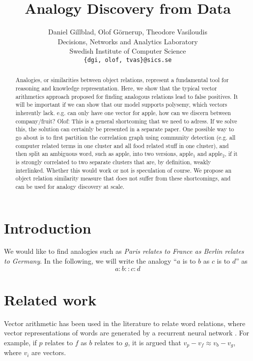 \documentclass{article} %
\title{Analogy Discovery from Data}
\author{
Daniel Gillblad, Olof G\"{o}rnerup, Theodore Vasiloudis \\
Decisions, Networks and Analytics Laboratory\\
Swedish Institute of Computer Science\\
\texttt{\{dgi, olof, tvas\}@sics.se}
}
\newcommand{\comment}[1]{{\small \color{red} {#1}} \normalcolor}
\begin{document}
\maketitle

\begin{abstract}
Analogies, or similarities between object relations, represent a fundamental tool for reasoning and knowledge 
representation. Here, we show that the typical vector arithmetics approach proposed for finding analogous relations lead to 
false positives. \comment{It will be important if we can show that our model supports polysemy, which vectors inherently lack. 
e.g. can only have one vector for apple, how can we discern between company/fruit? Olof: This is a general shortcoming that we
need to adress. If we solve this, the solution can certainly be presented in a separate paper. One possible way to go about is to first 
partition the correlation graph using community detection (e.g. all computer related terms in one cluster and all food related stuff in one
cluster), and then split an ambiguous word, such as apple, into two versions, apple$_1$ and apple$_2$, if it is strongly correlated to
two separate clusters that are, by definition, weakly interlinked. Whether this would work or not is speculation of course.}
We propose an object relation similarity measure that does not suffer from these shortcomings, and can be 
used for analogy discovery at scale.
\end{abstract}

\section{Introduction}

We would like to find analogies such as \emph{Paris relates to France as Berlin relates to Germany}. In the following, we 
will write the analogy ``$a$ is to $b$ as $c$ is to $d$'' as
\begin{equation}
a : b :: c : d
\end{equation}

\section{Related work}
Vector arithmetic has been used in the literature to relate word relations, where vector representations
of words are generated by a recurrent neural network \cite{Mikolov2013}. For example, if
$p$ relates to $f$ as $b$ relates to $g$, it is argued that $v_{p} - v_{f} \approx v_{b} - v_{g}$, where $v_i$ are
vectors.
\end{document}
